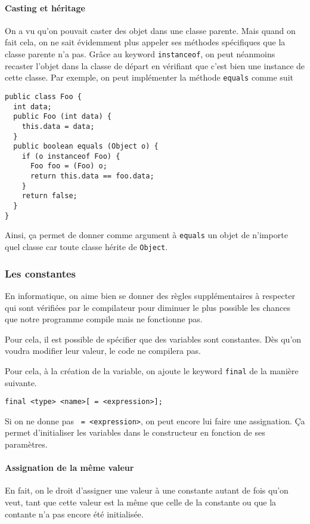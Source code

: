 \paragraph{Casting et héritage}
\label{sec:cast_class}
On a vu qu'on pouvait caster des objet dans une classe parente.
Mais quand on fait cela, on ne sait évidemment plus appeler ses méthodes
spécifiques que la classe parente n'a pas.
Grâce au keyword \lstinline|instanceof|, on peut néanmoins recaster l'objet
dans la classe de départ en vérifiant que c'est bien une instance de cette
classe.
Par exemple, on peut implémenter la méthode \lstinline|equals| comme suit
\begin{lstlisting}
public class Foo {
  int data;
  public Foo (int data) {
    this.data = data;
  }
  public boolean equals (Object o) {
    if (o instanceof Foo) {
      Foo foo = (Foo) o;
      return this.data == foo.data;
    }
    return false;
  }
}
\end{lstlisting}
Ainsi, ça permet de donner comme argument à \lstinline|equals| un objet de
n'importe quel classe car toute classe hérite de \lstinline|Object|.

\subsubsection{Les constantes}
En informatique, on aime bien se donner des règles supplémentaires à respecter
qui sont vérifiées par le compilateur pour diminuer le plus possible les
chances que notre programme compile mais ne fonctionne pas.

Pour cela, il est possible de spécifier que des variables sont constantes.
Dès qu'on voudra modifier leur valeur, le code ne compilera pas.

Pour cela, à la création de la variable, on ajoute le keyword \lstinline|final|
de la manière suivante.
\begin{lstlisting}
final <type> <name>[ = <expression>];
\end{lstlisting}
Si on ne donne pas \lstinline| = <expression>|, on peut encore lui faire une
assignation.
Ça permet d'initialiser les variables dans le constructeur en fonction
de ses paramètres.

\paragraph{Assignation de la même valeur}
En fait, on le droit d'assigner une valeur à une constante autant de
fois qu'on veut, tant que cette valeur est la même que celle de la constante
ou que la contante n'a pas encore été initialisée.

